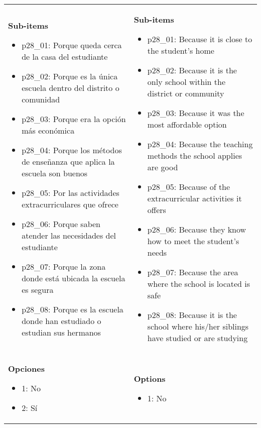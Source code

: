 \documentclass[11pt]{article}
\begin{document}
\begin{longtable}{@{}LL@{}}
\textbf{Sub-items}\par\begin{itemize}[leftmargin=*]\item p28\_01: Porque queda cerca de la casa del estudiante
\item p28\_02: Porque es la única escuela dentro del distrito o comunidad
\item p28\_03: Porque era la opción más económica
\item p28\_04: Porque los métodos de enseñanza que aplica la escuela son buenos
\item p28\_05: Por las actividades extracurriculares que ofrece
\item p28\_06: Porque saben atender las necesidades del estudiante
\item p28\_07: Porque la zona donde está ubicada la escuela es segura
\item p28\_08: Porque es la escuela donde han estudiado o estudian sus hermanos\end{itemize} & \textbf{Sub-items}\par\begin{itemize}[leftmargin=*]\item p28\_01: Because it is close to the student's home
\item p28\_02: Because it is the only school within the district or community
\item p28\_03: Because it was the most affordable option
\item p28\_04: Because the teaching methods the school applies are good
\item p28\_05: Because of the extracurricular activities it offers
\item p28\_06: Because they know how to meet the student's needs
\item p28\_07: Because the area where the school is located is safe
\item p28\_08: Because it is the school where his/her siblings have studied or are studying\end{itemize} \\
\textbf{Opciones}\par\begin{itemize}[leftmargin=*]\item 1: No
\item 2: Sí\end{itemize} & \textbf{Options}\par\begin{itemize}[leftmargin=*]\item 1: No

\end{itemize}
\end{longtable}
\end{document}
